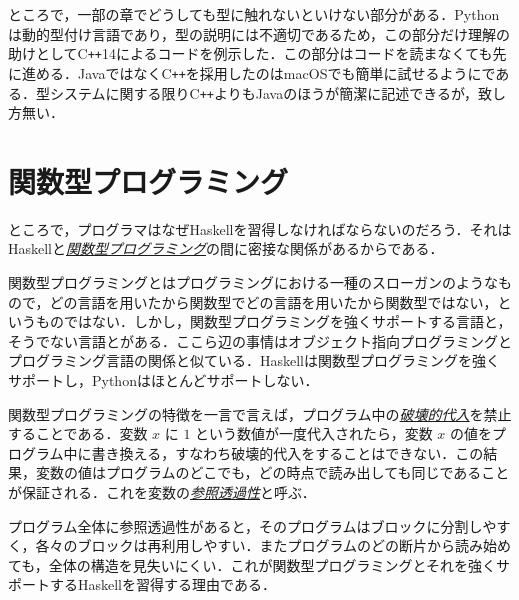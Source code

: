 \documentclass[a4paper,draft]{jsbook}
\newcommand{\programminglanguage}[1]{\textsf{#1}}
\newcommand{\cxx}{\programminglanguage{C}\texttt{++}}
\newcommand{\cxxfourteen}{\cxx\programminglanguage{14}}
\newcommand{\haskell}{\programminglanguage{Haskell}}
\newcommand{\java}{\programminglanguage{Java}}
\newcommand{\python}{\programminglanguage{Python}}
\newcommand{\keyword}[1]{{\underline{\emph{#1}}}}
\begin{document}
ところで，一部の章でどうしても型に触れないといけない部分がある．\python は動的型付け言語であり，型の説明には不適切であるため，この部分だけ理解の助けとして\cxxfourteen によるコードを例示した．この部分はコードを読まなくても先に進める．\java ではなく\cxx を採用したのはmacOSでも簡単に試せるようにである．型システムに関する限り\cxx よりも\java のほうが簡潔に記述できるが，致し方無い．

\section{関数型プログラミング}

ところで，プログラマはなぜ\haskell を習得しなければならないのだろう．それは\haskell と\keyword{関数型プログラミング}の間に密接な関係があるからである．

関数型プログラミングとはプログラミングにおける一種のスローガンのようなもので，どの言語を用いたから関数型でどの言語を用いたから関数型ではない，というものではない．しかし，関数型プログラミングを強くサポートする言語と，そうでない言語とがある．ここら辺の事情はオブジェクト指向プログラミングとプログラミング言語の関係と似ている．\haskell は関数型プログラミングを強くサポートし，\python はほとんどサポートしない．

関数型プログラミングの特徴を一言で言えば，プログラム中の\keyword{破壊的代入}を禁止することである．変数 $x$ に $1$ という数値が一度代入されたら，変数 $x$ の値をプログラム中に書き換える，すなわち破壊的代入をすることはできない．この結果，変数の値はプログラムのどこでも，どの時点で読み出しても同じであることが保証される．これを変数の\keyword{参照透過性}と呼ぶ．

プログラム全体に参照透過性があると，そのプログラムはブロックに分割しやすく，各々のブロックは再利用しやすい．またプログラムのどの断片から読み始めても，全体の構造を見失いにくい．これが関数型プログラミングとそれを強くサポートする\haskell を習得する理由である．



\end{document}
